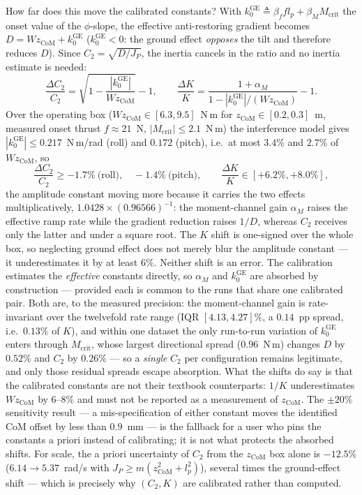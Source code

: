 How far does this move the calibrated constants? With
$k_0^{\mathrm{GE}} \triangleq \beta_f f l_p + \beta_M M_{\mathrm{crit}}$
the onset value of the $\phi$-slope, the effective anti-restoring
gradient becomes $D = W z_{\mathrm{CoM}} + k_0^{\mathrm{GE}}$
($k_0^{\mathrm{GE}} < 0$: the ground effect \emph{opposes} the tilt and
therefore reduces $D$). Since $C_2 = \sqrt{D/J_P}$, the inertia
cancels in the ratio and no inertia estimate is needed:
\begin{equation}
  \frac{\Delta C_2}{C_2} = \sqrt{1 - \frac{|k_0^{\mathrm{GE}}|}
                                        {W z_{\mathrm{CoM}}}} - 1,
  \qquad
  \frac{\Delta K}{K} = \frac{1 + \alpha_M}
       {1 - |k_0^{\mathrm{GE}}|/(W z_{\mathrm{CoM}})} - 1 .
  \label{eq:ge-constant-shift}
\end{equation}
Over the operating box ($W z_{\mathrm{CoM}} \in [6.3, 9.5]$~N\,m for
$z_{\mathrm{CoM}} \in [0.2, 0.3]$~m, measured onset thrust
$f \approx 21$~N, $|M_{\mathrm{crit}}| \le 2.1$~N\,m) the interference
model gives $|k_0^{\mathrm{GE}}| \le 0.217$~N\,m/rad (roll) and
$0.172$ (pitch), i.e.\ at most $3.4\%$ and $2.7\%$ of
$W z_{\mathrm{CoM}}$, so
\begin{equation*}
  \frac{\Delta C_2}{C_2} \ge -1.7\%\ \text{(roll)},\quad
  -1.4\%\ \text{(pitch)}, \qquad
  \frac{\Delta K}{K} \in [+6.2\%, +8.0\%] ,
\end{equation*}
the amplitude constant moving more because it carries the two effects
multiplicatively, $1.0428 \times (0.96566)^{-1}$: the moment-channel
gain $\alpha_M$ raises the effective ramp rate while the gradient
reduction raises $1/D$, whereas $C_2$ receives only the latter and
under a square root. The $K$ shift is one-signed over the whole box,
so neglecting ground effect does not merely blur the amplitude constant
— it underestimates it by at least $6\%$.
Neither shift is an error. The calibration estimates the
\emph{effective} constants directly, so $\alpha_M$ and
$k_0^{\mathrm{GE}}$ are absorbed by construction — provided each is
common to the runs that share one calibrated pair. Both are, to the
measured precision: the moment-channel gain is rate-invariant over the
twelvefold rate range (IQR $[4.13,4.27]\%$, a $0.14$~pp spread, i.e.\
$0.13\%$ of $K$), and within one dataset the only run-to-run variation
of $k_0^{\mathrm{GE}}$ enters through $M_{\mathrm{crit}}$, whose largest
directional spread ($0.96$~N\,m) changes $D$ by $0.52\%$ and $C_2$ by
$0.26\%$ — so a \emph{single} $C_2$ per configuration remains
legitimate, and only those residual spreads escape absorption. What the
shifts do say is that the calibrated constants are not their textbook
counterparts: $1/K$ underestimates $W z_{\mathrm{CoM}}$ by $6$–$8\%$ and
must not be reported as a measurement of $z_{\mathrm{CoM}}$. The
$\pm20\%$ sensitivity result — a mis-specification of either constant
moves the identified CoM offset by less than $0.9$~mm — is the fallback
for a user who pins the constants a priori instead of calibrating; it is
not what protects the absorbed shifts. For
scale, the a priori uncertainty of $C_2$ from the $z_{\mathrm{CoM}}$
box alone is $-12.5\%$ ($6.14 \to 5.37$~rad/s with
$J_P \ge m(z_{\mathrm{CoM}}^2 + l_p^2)$), several times the
ground-effect shift — which is precisely why $(C_2, K)$ are calibrated
rather than computed.

